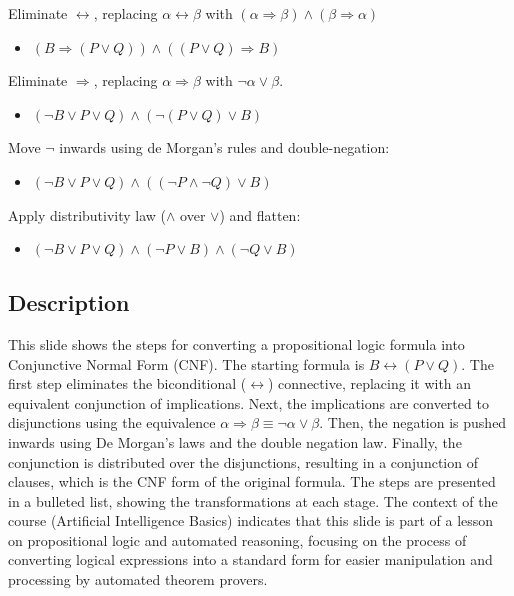 \documentclass{article}%
\begin{document}
Eliminate $\leftrightarrow$, replacing $\alpha \leftrightarrow \beta$ with $(\alpha \Rightarrow \beta) \wedge (\beta \Rightarrow \alpha)$

\begin{itemize}
    \item $(B \Rightarrow (P \vee Q)) \wedge ((P \vee Q) \Rightarrow B)$
\end{itemize}

Eliminate $\Rightarrow$, replacing $\alpha \Rightarrow \beta$ with $\neg\alpha \vee \beta$.

\begin{itemize}
    \item $(\neg B \vee P \vee Q) \wedge (\neg(P \vee Q) \vee B)$
\end{itemize}

Move $\neg$ inwards using de Morgan's rules and double-negation:

\begin{itemize}
    \item $(\neg B \vee P \vee Q) \wedge ((\neg P \wedge \neg Q) \vee B)$
\end{itemize}

Apply distributivity law ($\wedge$ over $\vee$) and flatten:

\begin{itemize}
    \item $(\neg B \vee P \vee Q) \wedge (\neg P \vee B) \wedge (\neg Q \vee B)$
\end{itemize}
%
\subsection{Description}%
This slide shows the steps for converting a propositional logic formula into Conjunctive Normal Form (CNF).  The starting formula is $B \leftrightarrow (P \vee Q)$.  The first step eliminates the biconditional ($\leftrightarrow$) connective, replacing it with an equivalent conjunction of implications.  Next, the implications are converted to disjunctions using the equivalence $\alpha \Rightarrow \beta \equiv \neg\alpha \vee \beta$.  Then, the negation is pushed inwards using De Morgan's laws and the double negation law.  Finally, the conjunction is distributed over the disjunctions, resulting in a conjunction of clauses, which is the CNF form of the original formula.  The steps are presented in a bulleted list, showing the transformations at each stage.  The context of the course (Artificial Intelligence Basics) indicates that this slide is part of a lesson on propositional logic and automated reasoning, focusing on the process of converting logical expressions into a standard form for easier manipulation and processing by automated theorem provers.%
\end{document}
